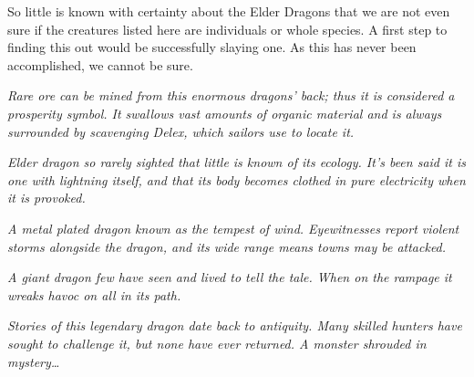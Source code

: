 So little is known with certainty about the Elder Dragons that we are not even sure if the creatures listed here are individuals or whole species. A first step to finding this out would be successfully slaying one. As this has never been accomplished, we cannot be sure.

\textit{Rare ore can be mined from this enormous dragons' back; thus it is considered a prosperity symbol. It swallows vast amounts of organic material and is always surrounded by scavenging Delex, which sailors use to locate it.}

\textit{Elder dragon so rarely sighted that little is known of its ecology. It's been said it is one with lightning itself, and that its body becomes clothed in pure electricity when it is provoked.}

\textit{A metal plated dragon known as the tempest of wind. Eyewitnesses report violent storms alongside the dragon, and its wide range means towns may be attacked.}

\textit{A giant dragon few have seen and lived to tell the tale. When on the rampage it wreaks havoc on all in its path.}

\textit{Stories of this legendary dragon date back to antiquity. Many skilled hunters have sought to challenge it, but none have ever returned. A monster shrouded in mystery\ldots}

